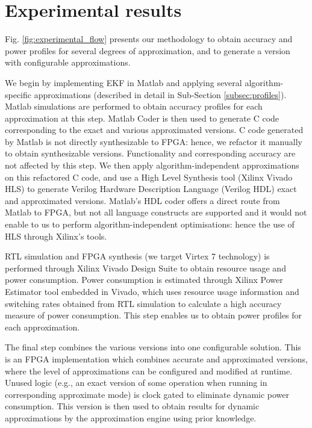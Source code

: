 \section{Experimental results}\label{experiments}

Fig. \ref{fig:experimental_flow} presents our methodology to obtain accuracy and power profiles for several degrees of approximation, and to generate a version with configurable approximations. 
\par We begin by implementing EKF in Matlab and applying several algorithm-specific approximations (described in detail in Sub-Section \ref{subsec:profiles}). Matlab simulations are performed to obtain accuracy profiles for each approximation at this step. Matlab Coder is then used to generate C code corresponding to the exact and various approximated versions. C code generated by Matlab is not directly synthesizable to FPGA: hence, we refactor it manually to obtain synthesizable versions. Functionality and corresponding accuracy are not affected by this step. We then apply algorithm-independent approximations on this refactored C code, and use a High Level Synthesis tool (Xilinx Vivado HLS) to generate Verilog Hardware Description Language (Verilog HDL) exact and approximated versions. Matlab's HDL coder offers a direct route from Matlab to FPGA, but not all language constructs are supported and it would not enable to us to perform algorithm-independent optimisations: hence the use of HLS through Xilinx's tools.
\par RTL simulation and FPGA synthesis (we target Virtex 7 technology) is performed through Xilinx Vivado Design Suite to obtain resource usage and power consumption. Power consumption is estimated through Xilinx Power Estimator tool embedded in Vivado, which uses resource usage information and switching rates obtained from RTL simulation to calculate a high accuracy measure of power consumption. This step enables us to obtain power profiles for each approximation.
\par The final step combines the various versions into one configurable solution. This is an FPGA implementation which combines accurate and approximated versions, where the level of approximations can be configured and modified at runtime. Unused logic (e.g., an exact version of some operation when running in corresponding approximate mode) is clock gated to eliminate dynamic power consumption. This version is then used to obtain results for dynamic approximations by the approximation engine using prior knowledge.  


